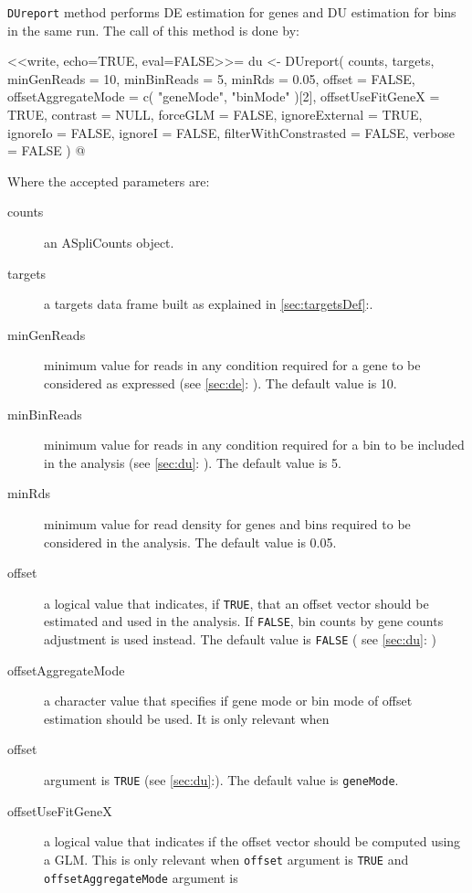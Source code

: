 \documentclass{article}
\newcommand{\secref}[1]{\ref{#1}:\nameref{#1}}
\begin{document}
\texttt{DUreport} method performs DE estimation for genes and DU estimation for
bins in the same run. The call of this method is done by:

<<write, echo=TRUE, eval=FALSE>>=
du <- DUreport( counts,
                targets,
                minGenReads = 10, 
                minBinReads = 5,
                minRds = 0.05, 
                offset = FALSE, 
                offsetAggregateMode =  c( "geneMode", "binMode" )[2],
                offsetUseFitGeneX = TRUE,
                contrast = NULL, 
                forceGLM = FALSE, 
                ignoreExternal = TRUE, 
                ignoreIo = FALSE, 
                ignoreI = FALSE,
                filterWithConstrasted = FALSE,
                verbose = FALSE )
@

Where the accepted parameters are:
\begin{description}
  \item[counts] an ASpliCounts object.
  \item[targets] a targets data frame built as explained in 
  \secref{sec:targetsDef}.
  \item[minGenReads] minimum value for reads in any condition required for a
  gene to be considered as expressed (see \secref{sec:de} ). The default value
  is 10.
  \item[minBinReads] minimum value for reads in any condition required for a
  bin to be included in the analysis (see \secref{sec:du} ). The default value
  is 5.
  \item[minRds] minimum value for read density for genes and bins required to be
  considered in the analysis. The default value is 0.05.
  \item[offset] a logical value that indicates, if \texttt{TRUE}, that an offset
  vector should be estimated and used in the analysis. If \texttt{FALSE}, bin
  counts by gene counts adjustment is used instead. The default value is 
  \texttt{FALSE} ( see \secref{sec:du} )
  \item[offsetAggregateMode] a character value that specifies if gene mode or
  bin mode of offset estimation should be used. It is only relevant when
  \item[offset] argument is \texttt{TRUE} (see \secref{sec:du}). The default
  value is \texttt{geneMode}.
  \item[offsetUseFitGeneX] a logical value that indicates if
  the offset vector should be computed using a GLM. This is only relevant when \texttt{offset}
  argument is \texttt{TRUE} and \texttt{offsetAggregateMode} argument is

\end{description}
\end{document}
